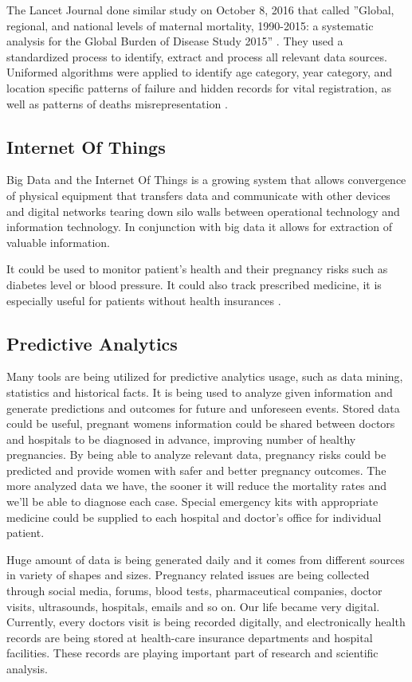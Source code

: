 \documentclass[sigconf]{acmart}
\begin{document}
 The Lancet Journal done similar study on October 8, 2016 that called ''Global, regional, and national levels of maternal mortality, 1990-2015: a systematic analysis for the Global Burden of Disease Study 2015'' \cite{kassebaum2016global}. They used a standardized process to identify, extract and process all relevant data sources. Uniformed algorithms were applied to identify age category, year category, and location specific patterns of failure and hidden records for vital registration, as well as patterns of deaths misrepresentation \cite{mcginnis2013best}.

\subsection{Internet Of Things}

Big Data and the Internet Of Things is a growing system that allows convergence of physical equipment that transfers data and communicate with other devices and digital networks tearing down silo walls between operational technology  and  information technology. In conjunction with big data it allows for extraction of valuable information.

It could be used to  monitor patient's health and their pregnancy risks  such as diabetes level or blood pressure. It could also track prescribed medicine, it is especially useful for patients without health insurances \cite{kassebaum2016global}. 

\subsection{Predictive Analytics}

Many tools are being utilized for predictive analytics usage, such as data mining, statistics and historical facts. It is being used to analyze given information and generate predictions and outcomes for future and unforeseen events. Stored data could be useful, pregnant women\textquotesingle s  information could be shared between doctors and hospitals to be diagnosed in advance, improving number of healthy pregnancies. By being able to analyze relevant data, pregnancy risks could be predicted and provide women with safer and better pregnancy outcomes. The more analyzed data we have, the sooner it will reduce the mortality rates and we'll be able to diagnose each case. Special emergency kits with appropriate medicine could be supplied to each hospital and doctor's office for individual patient.

Huge amount of data is being generated daily and it comes from different sources in variety of shapes and sizes. Pregnancy related issues are being collected through social media, forums, blood tests, pharmaceutical companies, doctor visits, ultrasounds, hospitals, emails and so on. Our life became very digital. Currently, every doctor\textquotesingle s  visit is being recorded digitally, and electronically health records are being stored at health-care insurance departments and hospital facilities. These records are playing important part of research and scientific analysis.
\end{document}
